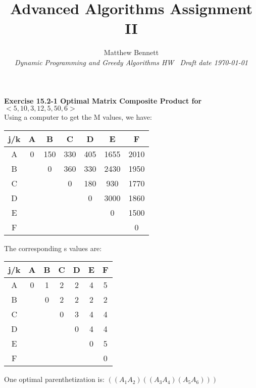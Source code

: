 \documentclass[10pt,fullpage]{article}
\title{ Advanced Algorithms Assignment II }
\author{Matthew Bennett \\
{\small\em Dynamic Programming and Greedy Algorithms HW \  Draft
date \today }}
\date{ }
\begin{document}
\maketitle

\textbf{Exercise 15.2-1 Optimal Matrix Composite Product for
$<5,10,3,12,5,50,6>$}\\

Using a computer to get the M values, we have:\\

\begin{tabular}{|c|c|c|c|c|c|c|}
  \hline
   j/k & A & B & C & D & E & F \\
  \hline
   A & 0 & 150 & 330  & 405  & 1655  &  2010 \\
  \hline
   B &   & 0 & 360 & 330  &  2430 & 1950  \\
  \hline
   C &   &   & 0 & 180  &  930 & 1770  \\
  \hline
   D &   &   &   & 0 & 3000  & 1860  \\
  \hline
   E &   &   &   &   & 0 & 1500  \\
  \hline
   F &   &   &   &   &   & 0 \\
  \hline
\end{tabular}

The corresponding s values are:\\

\begin{tabular}{|c|c|c|c|c|c|c|}
  \hline
   j/k & A & B & C & D & E & F \\
  \hline
   A & 0 & 1 & 2  & 2  & 4  &  5 \\
  \hline
   B &   & 0 & 2 & 2  &  2 & 2  \\
  \hline
   C &   &   & 0 & 3  &  4 & 4  \\
  \hline
   D &   &   &   & 0 & 4  & 4  \\
  \hline
   E &   &   &   &   & 0 & 5  \\
  \hline
   F &   &   &   &   &   & 0 \\
  \hline
\end{tabular}

One optimal parenthetization is: $((A_1A_2)((A_3A_4)(A_5A_6)))$

\newpage
\end{document}
